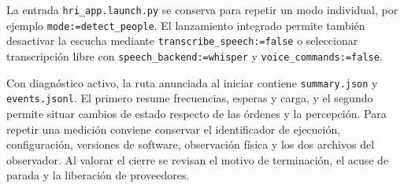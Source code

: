 \documentclass[11pt,letterpaper]{article}
\newcommand{\code}[1]{\nolinkurl{#1}}
\begin{document}
La entrada \code{hri_app.launch.py} se conserva para repetir un modo individual, por ejemplo \code{mode:=detect_people}. El lanzamiento integrado permite también desactivar la escucha mediante \code{transcribe_speech:=false} o seleccionar transcripción libre con \code{speech_backend:=whisper} y \code{voice_commands:=false}.

Con diagnóstico activo, la ruta anunciada al iniciar contiene \code{summary.json} y \code{events.jsonl}. El primero resume frecuencias, esperas y carga, y el segundo permite situar cambios de estado respecto de las órdenes y la percepción. Para repetir una medición conviene conservar el identificador de ejecución, configuración, versiones de software, observación física y los dos archivos del observador. Al valorar el cierre se revisan el motivo de terminación, el acuse de parada y la liberación de proveedores.
\end{document}
